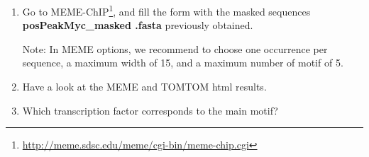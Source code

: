 \documentclass[a4paper,11pt]{article}
\begin{document}
\begin{enumerate}
\item Go to
  MEME-ChIP\footnote{\url{http://meme.sdsc.edu/meme/cgi-bin/meme-chip.cgi}},
  and fill the form with the masked sequences \textbf{posPeakMyc\_masked .fasta} previously
  obtained.

Note: In MEME options, we recommend to choose one occurrence per sequence, a maximum width of 15, and a maximum number of motif of 5.
\item Have a look at the MEME and TOMTOM html results.
\item Which transcription factor corresponds to the main motif? 
\end{enumerate}
\end{document}
